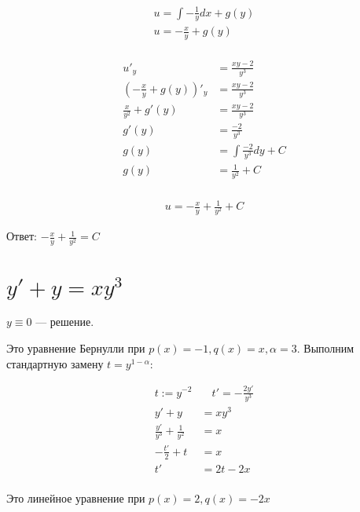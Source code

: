 \begin{align*}
    u = \int -\frac{1}{y}dx + g(y) \\
    u = -\frac{x}{y} + g(y)        \\
\end{align*}

\begin{align*}
    u'_y                                & = \frac{xy-2}{y^3}          \\
    \left(-\frac{x}{y} + g(y)\right)'_y & = \frac{xy-2}{y^3}          \\
    \frac{x}{y^2} + g'(y)               & = \frac{xy-2}{y^3}          \\
    g'(y)                               & = \frac{-2}{y^3}            \\
    g(y)                                & = \int \frac{-2}{y^3}dy + C \\
    g(y)                                & = \frac{1}{y^2} + C         \\
\end{align*}

\begin{align*}
    u = -\frac{x}{y} + \frac{1}{y^2} + C
\end{align*}

Ответ: $-\frac{x}{y} + \frac{1}{y^2} = C$

\section{$y'+y=xy^3$}

$y\equiv0$ --- решение.

Это уравнение Бернулли при $p(x) = -1, q(x) = x, \alpha = 3$. Выполним стандартную замену $t = y^{1-\alpha}$:

\begin{align*}
    t := y^{-2}                  & \quad t' = -\frac{2y'}{y^3} \\
    y'+y                         & = xy^3                      \\
    \frac{y'}{y^3}+\frac{1}{y^2} & = x                         \\
    -\frac{t'}{2} + t            & = x                         \\
    t'                           & = 2t - 2x                   \\
\end{align*}

Это линейное уравнение при $p(x) = 2, q(x) = -2x$

